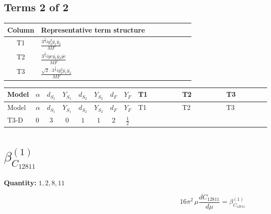 \documentclass[8pt]{article}
\begin{document}
\begin{landscape}
\subsection*{Terms 2 of 2}
\begin{center}
\begin{tabular}{@{}c >{\raggedright\arraybackslash}p{0.82\linewidth}@{}}
\toprule
Column & Representative term structure \\
\midrule
T1 & \(\displaystyle \frac{3^{\frac{3}{4}} i g_{2}^{2} \overline{y_{1}} \overline{y_{2}}}{MF}\) \\
\midrule
T2 & \(\displaystyle \frac{3^{\frac{3}{4}} i ye \overline{y_{1}} \overline{y_{2}} \overline{ye}}{MF}\) \\
\midrule
T3 & \(\displaystyle \frac{\sqrt{2} \cdot 3^{\frac{3}{4}} i g_{2}^{2} \overline{y_{1}} \overline{y_{2}}}{MF}\) \\
\midrule
\bottomrule
\end{tabular}
\end{center}
\smallskip
\tiny
\begin{longtable}{@{}llcccccc >{\raggedright\arraybackslash}p{0.21\linewidth} >{\raggedright\arraybackslash}p{0.21\linewidth} >{\raggedright\arraybackslash}p{0.21\linewidth}@{}}
\toprule
Model & $\alpha$ & $d_{S_1}$ & $Y_{S_1}$ & $d_{S_2}$ & $Y_{S_2}$ & $d_F$ & $Y_F$ & T1 & T2 & T3 \\
\midrule
\endfirsthead
\toprule
Model & $\alpha$ & $d_{S_1}$ & $Y_{S_1}$ & $d_{S_2}$ & $Y_{S_2}$ & $d_F$ & $Y_F$ & T1 & T2 & T3 \\
\midrule
\endhead
T3-D & $0$ & $3$ & $0$ & $1$ & $1$ & $2$ & $\frac{1}{2}$ & \scriptsize\adjustbox{max width=\linewidth}{$\begin{gathered} \frac{25 \cdot 3^{\frac{3}{4}} i g_{2}^{2} \overline{y_{1}} \overline{y_{2}}}{24 MF}\end{gathered}$} & \scriptsize\adjustbox{max width=\linewidth}{$\begin{gathered} - \frac{3^{\frac{3}{4}} i ye \overline{y_{1}} \overline{y_{2}} \overline{ye}}{12 MF}\end{gathered}$} & \scriptsize\adjustbox{max width=\linewidth}{$\begin{gathered} \frac{\sqrt{2} \cdot 3^{\frac{3}{4}} i g_{2}^{2} \overline{y_{1}} \overline{y_{2}}}{6 MF}\end{gathered}$} \\
\midrule
\bottomrule
\end{longtable}
\clearpage
\section*{$\beta_{C_{12811}}^{(1)}$}
\noindent\textbf{Quantity: }$\mathrm{1,2,8,11}$\par\smallskip
\[16\pi^2\,\mu\frac{d C_{12811}}{d\mu}=\beta_{C_{12811}}^{(1)}\]

\end{landscape}
\end{document}

